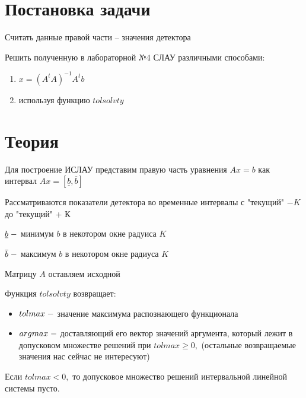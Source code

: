 \documentclass[a4]{article}
\renewcommand{\listoffigures}{\begingroup %
\tocsection
\tocfile{\listfigurename}{lof}
\endgroup}
\begin{document}
\newpage
\pagestyle{plain}



\newpage
\tableofcontents{}
\newpage
\listoffigures{}
\newpage

\section{Постановка задачи}
Считать данные правой части – значения детектора

Решить полученную в лабораторной $№4$ СЛАУ различными способами:

\begin{enumerate}
    \item $x=(A^tA)^{-1}A^tb$
    \item используя функцию $tolsolvty$ \hfill\cite{tolsolvty}
\end{enumerate}


\section{Теория}
Для построение ИСЛАУ представим правую часть уравнения $Ax=b$ как интервал $Ax = [ \underline b, \overline b]$

Рассматриваются показатели детектора во временные интервалы с "текущий" $ \minus K$ до "текущий" + К

$\underline b\;\--$ минимум $b$ в некотором окне радуиса $K$

$\overline b\;\--$ максимум $b$ в некотором окне радиуса $K$

Матрицу $A$ оставляем исходной

Функция $tolsolvty$ возвращает:
\begin{itemize}
    \item $tolmax\;\--$ значение максимума распознающего функционала
    \item $argmax\;\--$ доставляющий его вектор значений аргумента, который лежит в допусковом множестве решений при $tolmax\geq 0,$ (остальные возвращаемые значения нас сейчас не интересуют)
\end{itemize}

Если $tolmax<0,$ то допусковое множество решений интервальной линейной системы пусто.
\end{document}
